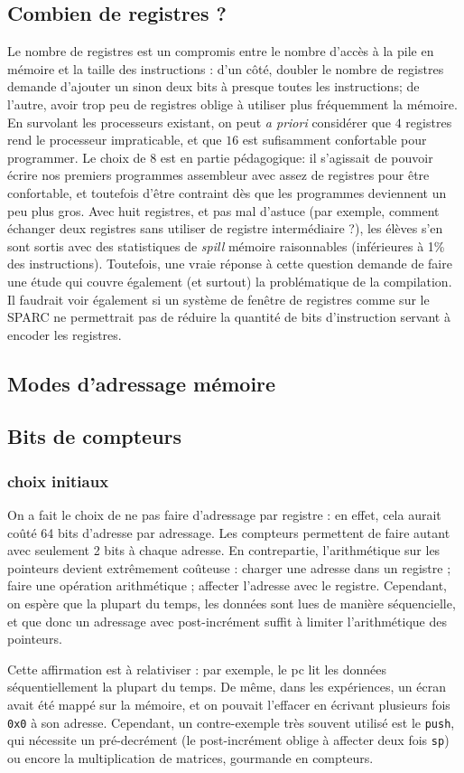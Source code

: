 \documentclass[architecture]{compas2018}
\begin{document}
\subsection{Combien de registres ?}
Le nombre de registres est un compromis entre le nombre d'accès à la pile en mémoire et la taille des instructions :
d'un côté, doubler le nombre de registres demande d'ajouter un sinon deux bits à presque toutes les instructions;
de l'autre, avoir trop peu de registres oblige à utiliser plus fréquemment la mémoire.
En survolant les processeurs existant, on peut {\it a priori} considérer que $4$ registres rend le processeur impraticable, et que $16$ est sufisamment confortable pour programmer.
Le choix de 8 est en partie pédagogique: il s'agissait de pouvoir écrire nos premiers programmes assembleur avec assez de registres pour être confortable, et toutefois d'être contraint dès que les programmes deviennent un peu plus gros. 
Avec huit registres, et pas mal d'astuce (par exemple, comment échanger deux registres sans utiliser de registre intermédiaire ?), les élèves s'en sont sortis avec des statistiques de \emph{spill} mémoire raisonnables (inférieures à 1\% des instructions).
Toutefois, une vraie réponse à cette question demande de faire une étude qui couvre également (et surtout) la problématique de la compilation.
% 
Il faudrait voir également si un système de fenêtre de registres comme sur le SPARC ne permettrait pas de réduire la quantité de bits d'instruction servant à encoder les registres.

\subsection{Modes d'adressage mémoire}
\subsection{Bits de compteurs}
\subsubsection{choix initiaux}
On a fait le choix de ne pas faire d'adressage par registre : en effet, cela aurait coûté 64 bits d'adresse par adressage. Les compteurs permettent de faire autant avec seulement 2 bits à chaque adresse. En contrepartie, l'arithmétique sur les pointeurs devient extrêmement coûteuse : charger une adresse dans un registre ; faire une opération arithmétique ; affecter l'adresse avec le registre. Cependant, on espère que la plupart du temps, les données sont lues de manière séquencielle, et que donc un adressage avec post-incrément suffit à limiter l'arithmétique des pointeurs.\par
Cette affirmation est à relativiser : par exemple, le pc lit les données séquentiellement la plupart du temps. De même, dans les expériences, un écran avait été mappé sur la mémoire, et on pouvait l'effacer en écrivant plusieurs fois \texttt{0x0} à son adresse. Cependant, un contre-exemple très souvent utilisé est le \texttt{push}, qui nécessite un pré-decrément (le post-incrément oblige à affecter deux fois \texttt{sp}) ou encore la multiplication de matrices, gourmande en compteurs.
\end{document}
